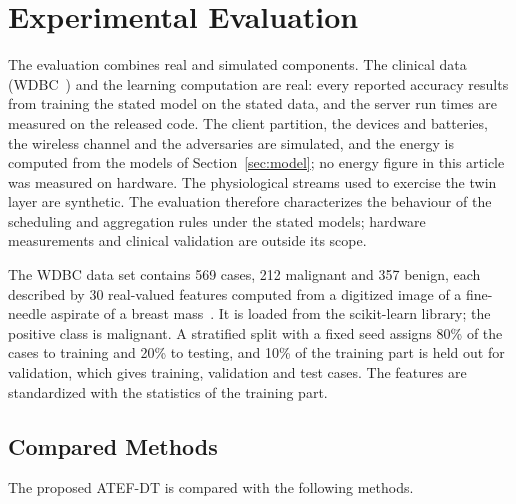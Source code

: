 \section{Experimental Evaluation}
\label{sec:experiments}

\begin{revblock}The evaluation combines real and simulated components. The clinical data (WDBC~\cite{wolberg1995breast}) and the learning computation are real: every reported accuracy results from training the stated model on the stated data, and the server run times are measured on the released code. The client partition, the devices and batteries, the wireless channel and the adversaries are simulated, and the energy is computed from the models of Section~\ref{sec:model}; no energy figure in this article was measured on hardware. The physiological streams used to exercise the twin layer are synthetic. The evaluation therefore characterizes the behaviour of the scheduling and aggregation rules under the stated models; hardware measurements and clinical validation are outside its scope.\end{revblock}

\begin{revblock}The WDBC data set contains 569 cases, 212 malignant and 357 benign, each described by 30 real-valued features computed from a digitized image of a fine-needle aspirate of a breast mass~\cite{wolberg1995breast}. It is loaded from the scikit-learn library; the positive class is malignant. A stratified split with a fixed seed assigns 80\% of the cases to training and 20\% to testing, and 10\% of the training part is held out for validation, which gives  training,  validation and  test cases. The features are standardized with the statistics of the training part.\end{revblock}

\subsection{Compared Methods}
\label{subsec:methods}
The proposed ATEF-DT is compared with the following methods.

